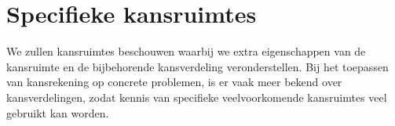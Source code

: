 \documentclass[a4paper]{report}
\theoremstyle{definition}
\begin{document}
\chapter{Specifieke kansruimtes}

We zullen kansruimtes beschouwen waarbij we extra eigenschappen van de kansruimte en de bijbehorende kansverdeling veronderstellen.
Bij het toepassen van kansrekening op concrete problemen, is er vaak meer bekend over kansverdelingen, zodat kennis van specifieke veelvoorkomende kansruimtes veel gebruikt kan worden.
%
%
%
%
\end{document}
